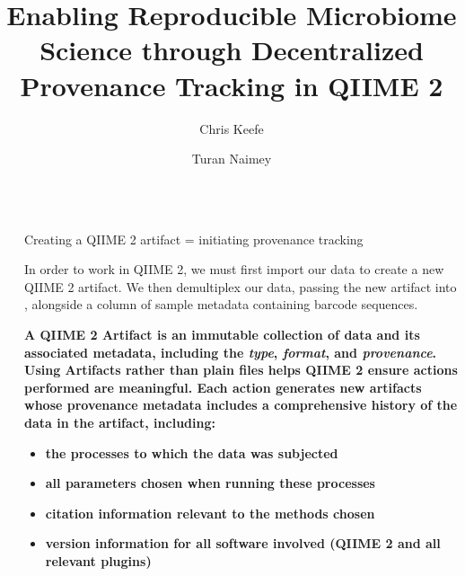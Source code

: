 \documentclass[final]{beamer}
\title{Enabling Reproducible Microbiome Science through Decentralized Provenance Tracking in QIIME 2}
\author{Chris Keefe \inst{1} \and Turan Naimey \inst{1}}
\institute[shortinst]{\inst{1} Northern Arizona University; Pathogen and Microbiome Institute}
\newlength{\sepwidth}
\newlength{\colwidth}
\newcommand{\separatorcolumn}{\begin{column}{\sepwidth}\end{column}}
\begin{document}
\begin{frame}[t]
\begin{columns}[t]
\separatorcolumn

\begin{column}{\colwidth}


  \begin{block}{Creating a QIIME 2 artifact = initiating provenance tracking}

   In order to work in QIIME 2, we must first import our data to create a new
   QIIME 2 artifact. We then demultiplex our data, passing the new artifact
   into , alongside a column of sample metadata containing
   barcode sequences. 

   \textbf{A QIIME 2  Artifact is an immutable collection of data and its associated
   metadata, including the \textit{type}, \textit{format}, and \textit{provenance}.
   Using Artifacts rather than plain files helps QIIME 2 ensure actions
   performed are meaningful. Each action generates new artifacts whose
   provenance metadata includes a comprehensive history of the data in the
   artifact, including:}
    \begin{itemize}
      \item \textbf{the processes to which the data was subjected}
      \item \textbf{all parameters chosen when running these processes}
      \item \textbf{citation information relevant to the methods chosen}
      \item \textbf{version information for all software involved (QIIME 2 and all relevant plugins)}
    \end{itemize}




\end{block}
\end{column}
\end{columns}
\end{frame}
\end{document}
